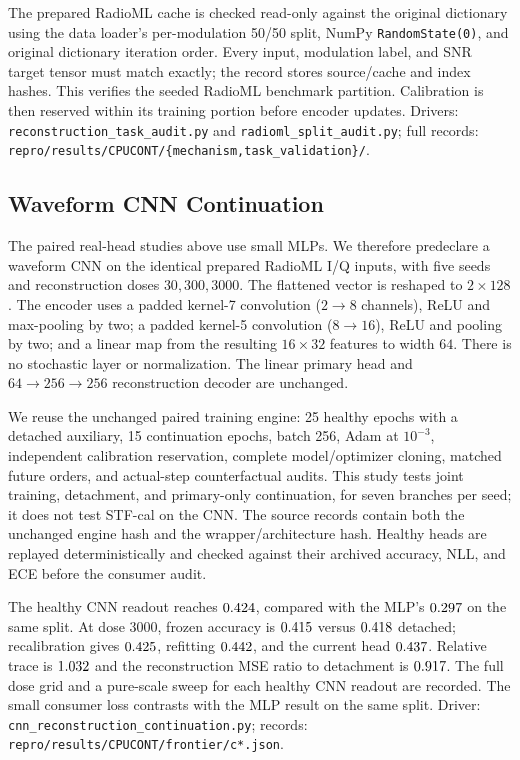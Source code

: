 \documentclass{article}
\begin{document}
The prepared RadioML cache is checked read-only against the original dictionary using the data loader's per-modulation 50/50 split, NumPy \texttt{RandomState(0)}, and original dictionary iteration order. Every input, modulation label, and SNR target tensor must match exactly; the record stores source/cache and index hashes. This verifies the seeded RadioML benchmark partition. Calibration is then reserved within its training portion before encoder updates. Drivers: \texttt{reconstruction\_task\_audit.py} and \texttt{radioml\_split\_audit.py}; full records: \texttt{repro/results/CPUCONT/\{mechanism,task\_validation\}/}.

\subsection{Waveform CNN Continuation}\label{app:cnn_continuation}

The paired real-head studies above use small MLPs. We therefore predeclare a waveform CNN on the identical prepared RadioML I/Q inputs, with five seeds and reconstruction doses $30,300,3000$. The flattened vector is reshaped to $2\times128$. The encoder uses a padded kernel-7 convolution ($2\to8$ channels), ReLU and max-pooling by two; a padded kernel-5 convolution ($8\to16$), ReLU and pooling by two; and a linear map from the resulting $16\times32$ features to width $64$. There is no stochastic layer or normalization. The linear primary head and $64\to256\to256$ reconstruction decoder are unchanged.

We reuse the unchanged paired training engine: 25 healthy epochs with a detached auxiliary, 15 continuation epochs, batch 256, Adam at $10^{-3}$, independent calibration reservation, complete model/optimizer cloning, matched future orders, and actual-step counterfactual audits. This study tests joint training, detachment, and primary-only continuation, for seven branches per seed; it does not test STF-cal on the CNN. The source records contain both the unchanged engine hash and the wrapper/architecture hash. Healthy heads are replayed deterministically and checked against their archived accuracy, NLL, and ECE before the consumer audit.



The healthy CNN readout reaches $0.424$, compared with the MLP's $0.297$ on the same split. At dose $3000$, frozen accuracy is $0.415$ versus $0.418$ detached; recalibration gives $0.425$, refitting $0.442$, and the current head $0.437$. Relative trace is $1.032$ and the reconstruction MSE ratio to detachment is $0.917$. The full dose grid and a pure-scale sweep for each healthy CNN readout are recorded. The small consumer loss contrasts with the MLP result on the same split. Driver: \texttt{cnn\_reconstruction\_continuation.py}; records: \texttt{repro/results/CPUCONT/frontier/c*.json}.
\end{document}
